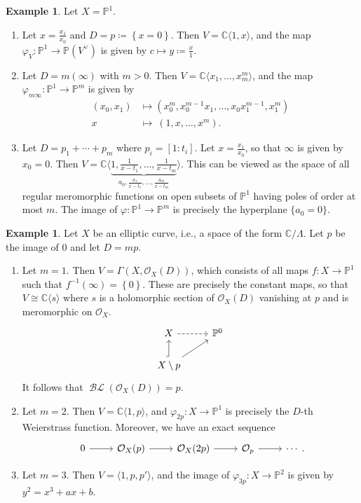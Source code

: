 \documentclass[10pt,letterpaper,cm]{nupset}
\theoremstyle{definition}
\newtheorem{exmp}[defn]{Example}
\theoremstyle{theorem}
\theoremstyle{remark}
\newcommand{\C}{\mathbb C}
\renewcommand{\O}{\mathcal O}
\renewcommand{\P}{\mathbb P}
\newcommand{\1}{\mathbb{1}}
\newcommand{\0}{\vec 0}
\DeclareMathOperator{\BL}{\mathcal{BL}}
\newcommand{\be}{\begin{enumerate}}
\newcommand{\ee}{\end{enumerate}}
\begin{document}
\begin{exmp} Let $X = \P^1$.
\be
\item Let $x= \frac{x_1}{x_0}$ and $D =p \coloneqq \left\{x=0\right\}$. Then $V = \C\langle 1, x \rangle$, and the map $\varphi_V : \P^1 \to \P\left(V^{\vee}\right)$ is given by $c\mapsto y\coloneqq \frac{x}{1}$.
\item Let $D = m\left(\infty\right)$ with $m>0$. Then $V= \C\langle x_1, \ldots, x_m^m\rangle$, and the map $\varphi_{m{\infty}} : \P^1 \to \P^m$ is given by
\begin{align*}
\left(x_0, x_1\right) & \mapsto \left(x_0^m, x_0^{m-1}x_1, \ldots, x_0x_1^{m-1}, x_1^m\right)
\\ x \ & \mapsto \  \left(1, x, \ldots, x^m\right).
\end{align*}
\item Let $D = p_1 + \cdots + p_m$ where $p_i = \left[1:t_i\right]$. Let $x = \frac{x_1}{x_0}$, so that $\infty$ is given by $x_0 =0$. Then $V = \C\langle \underbrace{1, \frac{1}{x-t_1}, \ldots, \frac{1}{x-t_m}}_{a_0, \frac{a_1}{x-t_1}, \ldots, \frac{a_m}{x-t_m}}\rangle$. This can be viewed as the space of all regular meromorphic functions on open subsets of $\P^1$ having poles of order at most $m$. The image of $\varphi : \P^1 \to \P^m$ is precisely the hyperplane $\{a_0 =0\}$.
\ee
\end{exmp}

\begin{exmp}
Let $X$ be an elliptic curve, i.e., a space of the form $\C/\Lambda$. Let $p$ be the image of $0$ and let $D = mp$. 
\be
\item Let $m =1$. Then $V = \Gamma\left(X, \O_X(D)\right)$, which consists of all maps $f: X \to \P^1$ such that $f^{-1}\left(\infty\right) = \left\{0\right\}$. These are precisely the constant maps, so that $V \cong \C\langle s\rangle$ where $s$ is a holomorphic section of $\O_X(D)$ vanishing at $p$ and is meromorphic on $\O_X$.
\[
\begin{tikzcd}
X \arrow[r, dashed]                     & \P^0 \\
X\setminus p \arrow[u, hook] \arrow[ru] &     
\end{tikzcd}
\]
It follows that  $\BL\left(\O_X(D)\right) =p$.
\item Let $m=2$. Then $V= \C\langle 1, p\rangle$, and $\varphi_{2p} : X \to \P^1$ is precisely the $D$-th Weierstrass function. Moreover, we have an exact sequence
\[
\begin{tikzcd}
0 \arrow[r] & \O_X(p) \arrow[r] & \O_X(2p) \arrow[r] & \O_p \arrow[r] & \cdots
\end{tikzcd}.
\]
\item Let $m=3$. Then $V = \langle 1, p, p'\rangle$, and the image of $\varphi_{3p} :X \to \P^2$ is given by $y^2 = x^3+ax+b$. 
\ee
\end{exmp}
\end{document}
